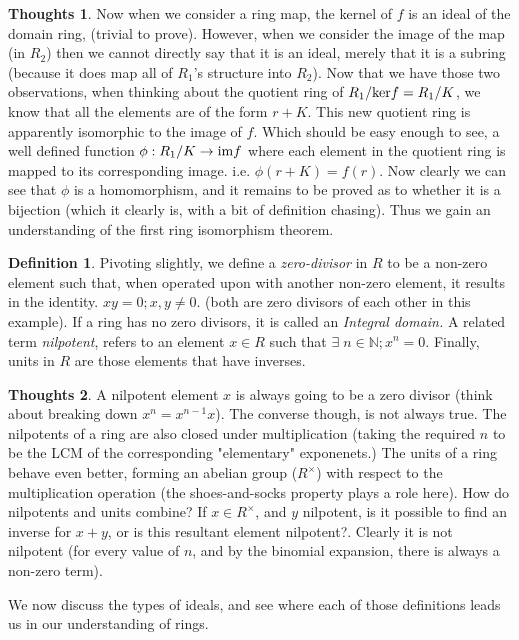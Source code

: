 \documentclass[12pt]{book}
\theoremstyle{definition}
\newtheorem*{definition}{Definition}
\newtheorem*{huh}{Thoughts}
\begin{document}
\begin{huh}
    Now when we consider a ring map, the kernel of $f$ is an ideal of the domain ring, (trivial to prove). However, when we consider the image of the map (in $R_2$) then we cannot directly say that it is an ideal, merely that it is a subring (because it does map all of $R_1$'s structure into $R_2$). Now that we have those two observations, when thinking about the quotient ring of $R_1/\textnormal{ker} f = R_1 / K$, we know that all the elements are of the form $r + K$. This new quotient ring is apparently isomorphic to the image of $f$. Which should be easy enough to see, a well defined function $\phi: R_1/K \to \textnormal{im} f$ where each element in the quotient ring is mapped to its corresponding image. i.e. $\phi(r + K) = f(r)$.
    Now clearly we can see that $\phi$ is a homomorphism, and it remains to be proved as to whether it is a bijection (which it clearly is, with a bit of definition chasing). Thus we gain an understanding of the first ring isomorphism theorem.
\end{huh}
\begin{definition}
    Pivoting slightly, we define a \textit{zero-divisor} in $R$ to be a non-zero element such that, when operated upon with another non-zero element, it results in the identity. $xy = 0; x, y \neq 0$. (both are zero divisors of each other in this example). If a ring has no zero divisors, it is called an \textit{Integral domain.} A related term \textit{nilpotent}, refers to an element $x \in R$ such that $\exists\; n \in \mathbb{N}; x^n = 0$. Finally, units in $R$ are those elements that have inverses.
\end{definition}
\begin{huh}
    A nilpotent element $x$ is always going to be a zero divisor (think about breaking down $x^n = x^{n-1} x$). The converse though, is not always true. The nilpotents of a ring are also closed under multiplication (taking the required $n$ to be the LCM of the corresponding "elementary" exponenets.) The units of a ring behave even better, forming an abelian group ($R^{\times}$) with respect to the multiplication operation (the shoes-and-socks property plays a role here). How do nilpotents and units combine? If $x \in R^{\times}$, and $y$ nilpotent, is it possible to find an inverse for $x + y$, or is this resultant element nilpotent?. Clearly it is not nilpotent (for every value of $n$, and by the binomial expansion, there is always a non-zero term). 
\end{huh}
We now discuss the types of ideals, and see where each of those definitions leads us in our understanding of rings.
\end{document}
